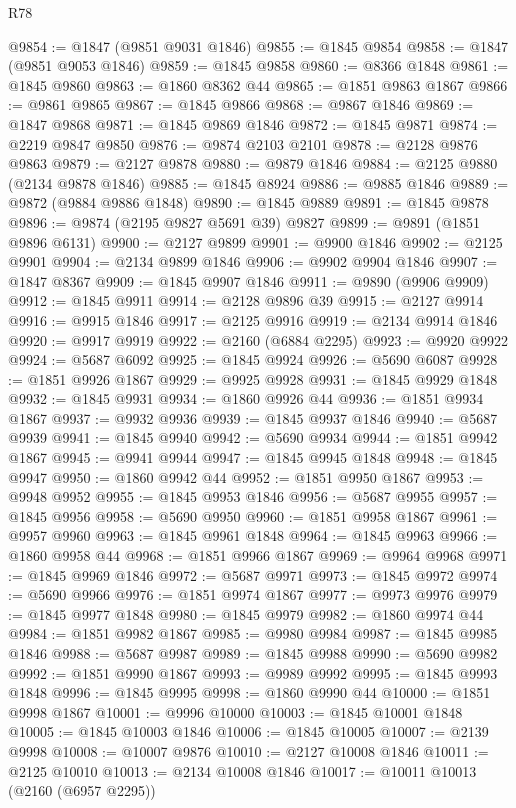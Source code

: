 \begin{lexlean}{R78}
\begin{coremodule}
@9854 := @1847 (@9851 @9031 @1846)
@9855 := @1845 @9854
@9858 := @1847 (@9851 @9053 @1846)
@9859 := @1845 @9858
@9860 := @8366 @1848
@9861 := @1845 @9860
@9863 := @1860 @8362 @44
@9865 := @1851 @9863 @1867
@9866 := @9861 @9865
@9867 := @1845 @9866
@9868 := @9867 @1846
@9869 := @1847 @9868
@9871 := @1845 @9869 @1846
@9872 := @1845 @9871
@9874 := @2219 @9847 @9850
@9876 := @9874 @2103 @2101
@9878 := @2128 @9876 @9863
@9879 := @2127 @9878
@9880 := @9879 @1846
@9884 := @2125 @9880 (@2134 @9878 @1846)
@9885 := @1845 @8924
@9886 := @9885 @1846
@9889 := @9872 (@9884 @9886 @1848)
@9890 := @1845 @9889
@9891 := @1845 @9878
@9896 := @9874 (@2195 @9827 @5691 @39) @9827
@9899 := @9891 (@1851 @9896 @6131)
@9900 := @2127 @9899
@9901 := @9900 @1846
@9902 := @2125 @9901
@9904 := @2134 @9899 @1846
@9906 := @9902 @9904 @1846
@9907 := @1847 @8367
@9909 := @1845 @9907 @1846
@9911 := @9890 (@9906 @9909)
@9912 := @1845 @9911
@9914 := @2128 @9896 @39
@9915 := @2127 @9914
@9916 := @9915 @1846
@9917 := @2125 @9916
@9919 := @2134 @9914 @1846
@9920 := @9917 @9919
@9922 := @2160 (@6884 @2295)
@9923 := @9920 @9922
@9924 := @5687 @6092
@9925 := @1845 @9924
@9926 := @5690 @6087
@9928 := @1851 @9926 @1867
@9929 := @9925 @9928
@9931 := @1845 @9929 @1848
@9932 := @1845 @9931
@9934 := @1860 @9926 @44
@9936 := @1851 @9934 @1867
@9937 := @9932 @9936
@9939 := @1845 @9937 @1846
@9940 := @5687 @9939
@9941 := @1845 @9940
@9942 := @5690 @9934
@9944 := @1851 @9942 @1867
@9945 := @9941 @9944
@9947 := @1845 @9945 @1848
@9948 := @1845 @9947
@9950 := @1860 @9942 @44
@9952 := @1851 @9950 @1867
@9953 := @9948 @9952
@9955 := @1845 @9953 @1846
@9956 := @5687 @9955
@9957 := @1845 @9956
@9958 := @5690 @9950
@9960 := @1851 @9958 @1867
@9961 := @9957 @9960
@9963 := @1845 @9961 @1848
@9964 := @1845 @9963
@9966 := @1860 @9958 @44
@9968 := @1851 @9966 @1867
@9969 := @9964 @9968
@9971 := @1845 @9969 @1846
@9972 := @5687 @9971
@9973 := @1845 @9972
@9974 := @5690 @9966
@9976 := @1851 @9974 @1867
@9977 := @9973 @9976
@9979 := @1845 @9977 @1848
@9980 := @1845 @9979
@9982 := @1860 @9974 @44
@9984 := @1851 @9982 @1867
@9985 := @9980 @9984
@9987 := @1845 @9985 @1846
@9988 := @5687 @9987
@9989 := @1845 @9988
@9990 := @5690 @9982
@9992 := @1851 @9990 @1867
@9993 := @9989 @9992
@9995 := @1845 @9993 @1848
@9996 := @1845 @9995
@9998 := @1860 @9990 @44
@10000 := @1851 @9998 @1867
@10001 := @9996 @10000
@10003 := @1845 @10001 @1848
@10005 := @1845 @10003 @1846
@10006 := @1845 @10005
@10007 := @2139 @9998
@10008 := @10007 @9876
@10010 := @2127 @10008 @1846
@10011 := @2125 @10010
@10013 := @2134 @10008 @1846
@10017 := @10011 @10013 (@2160 (@6957 @2295))

\end{coremodule}
\end{lexlean}
